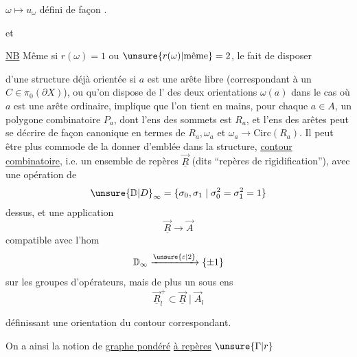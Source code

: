 $\omega\mapsto u_\omega$ défini de façon .

et 

\uline{NB} Même si $r(\omega)=1$ ou $\unsure{r(\omega)|\text{même}}=2$, le fait de disposer


d'une structure déjà orientée si $a$ est une arête libre (correspondant à un $C\in\pi_0(\partial X)$), ou qu'on dispose de l' des deux orientations $\omega(a)$ \deleted{\unsure{=}} dans le cas où $a$ est une arête ordinaire, implique que l'on tient en mains, pour chaque $a\in A$, un polygone combinatoire $P_a$, dont l'ens des sommets est $R_a$, et l'ens des arêtes peut se décrire  de façon canonique en termes de $R_a,\omega_a$ et $\omega_a\to\mathrm{Circ}(R_a)$. Il peut être plus commode de la donner d'emblée dans la structure,   \uline{contour combinatoire}, i.e. un ensemble de repères $\underline{\vec R}$ (dits ``repères de rigidification''), avec une opération de
\[
 {\unsure{\mathbb D|D}}_{\infty}=\{\sigma_0,\sigma_1\mid\sigma_0^2=\sigma_1^2=1\}
\]
dessus, et une application
\[
 \underline{\vec R}\longrightarrow\vec A
\]
compatible avec l'hom
\[
 \mathbb D_{\infty}\xrightarrow{\unsure{\varepsilon|2}}\{\pm1\}
\]
sur les groupes d'opérateurs, mais de plus un sous ens
\[
 \underline{\vec R}_{l}^{+}\subset\underline{\vec R}\mid\vec A_l
\]


définissant une orientation du contour correspondant.


On a ainsi la notion de \uline{graphe pondéré}  \uline{à repères} $\unsure{\Gamma|r}$



